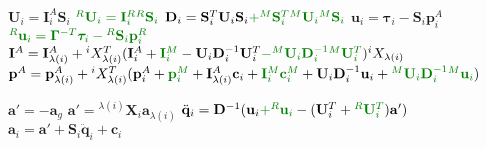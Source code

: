 \begin{algorithm}[H]
\begin{algorithmic}[1]
        \STATE $\mathbf{U}_i = \mathbf{I}_i ^A \mathbf{S}_i$
        \STATE $\color{webgreen}{{}^R\mathbf{U}_i = \mathbf{I}_i ^R {}^R\mathbf{S}_i}$
        \STATE $\mathbf{D} _i = \mathbf{S} ^T _i  {} \mathbf{U} _i \mathbf{S} _i \textcolor{webgreen}{+ {} ^M\mathbf{S} ^T _i  {} ^M\mathbf{U} _i {} ^M\mathbf{S} _i}$
        \STATE $\mathbf{u}_i = \boldsymbol{\tau}_i - \mathbf{S}_i\mathbf{p}_i^A$
        \STATE $\color{webgreen}{{}^R\mathbf{u}_i = \boldsymbol{\Gamma}^{-T}\boldsymbol{\tau}_i - {}^R\mathbf{S}_i\mathbf{p}_i^R}$
        \STATE $\mathbf{I} ^A = \mathbf{I} ^A _{\lambda (i)} + {} ^i X _{\lambda (i)} ^T (\mathbf{I} _i ^A + \textcolor{webgreen}{\mathbf{I} _i ^M } - {}  \mathbf{U} _i  \mathbf{D} ^{-1} _i  {}  \mathbf{U} ^T _i \textcolor{webgreen}{- {} ^M \mathbf{U} _i  \mathbf{D} ^{-1} _i {} ^M \mathbf{U} ^T _i}) {} ^i X _{\lambda (i)} $
        \STATE $\mathbf{p} ^A = \mathbf{p} ^A _{\lambda (i)} + {} ^i X _{\lambda (i)} ^T (\mathbf{p} ^A_i + \textcolor{webgreen}{\mathbf{p} ^M_i } + \mathbf{I} ^A _{\lambda (i)}  \mathbf{c}_i + \textcolor{webgreen}{\mathbf{I} {} ^M _i \mathbf{c} ^M _i }+ {}  \mathbf{U} _i \mathbf{D} ^{-1} _i {} \mathbf{u} _i + \textcolor{webgreen}{{} ^M \mathbf{U} _i \mathbf{D} ^{-1} _i {} ^M\mathbf{u} _i}) $
        \ENDIF
        \ENDFOR

        \STATE $\mathbf{a}' = -\mathbf{a}_g$
        \ELSE
        \STATE $\mathbf{a}' = {}^{\lambda(i)}\mathbf{X}_i \mathbf{a}_{\lambda(i)}$
        \STATE $\ddot{\mathbf{q}}_i = \mathbf{D}^{-1} (\mathbf{u}_i \textcolor{webgreen}{+ {}^R\mathbf{u}_i }- (\mathbf{U}_i^T + \textcolor{webgreen}{{}^R\mathbf{U}_i^T})\mathbf{a}')$
        \STATE $\mathbf{a}_i = \mathbf{a}' + \mathbf{S}_i\mathbf{\ddot{q}}_i + \mathbf{c} _i$
        \ENDIF
        \ENDFOR
    \end{algorithmic}
\end{algorithm}
